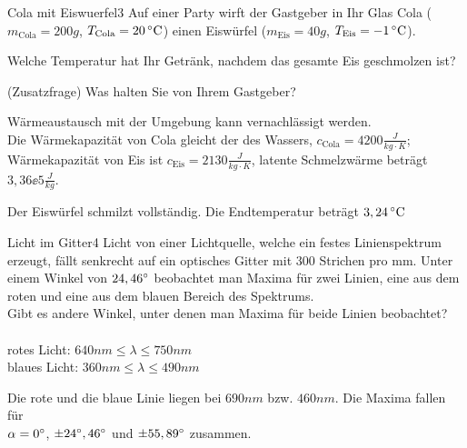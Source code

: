 



\begin{problem}{Cola mit Eiswuerfel}{3}
Auf einer Party wirft der Gastgeber in Ihr Glas Cola ($m_\mathrm{Cola} = 200\unit{g}$, $T_\mathrm{Cola} = 20\,^\circ\mathrm{C}$) einen Eiswürfel ($m_\mathrm{Eis} = 40\unit{g}$, $T_\mathrm{Eis} = -1\,^\circ\mathrm{C}$).
\begin{abcenum}
\item Welche Temperatur hat Ihr Getränk, nachdem das gesamte Eis geschmolzen ist?
\item (Zusatzfrage) Was halten Sie von Ihrem Gastgeber?
\end{abcenum}
Wärmeaustausch mit der Umgebung kann vernachlässigt werden.\\
Die Wärmekapazität von Cola gleicht der des Wassers, $c_{\mathrm{Cola}} = 4200\unit{\frac{J}{kg \cdot K}}$; Wärmekapazität von Eis ist $c_{\mathrm{Eis}} = 2130\unit{\frac{J}{kg \cdot K}}$, latente Schmelzwärme beträgt $3,36\ee{5}\unit{\frac{J}{kg}}$.
\begin{solution}
Der Eiswürfel schmilzt vollständig. Die Endtemperatur beträgt $3,24\,^\circ\mathrm{C}$
\end{solution}
\end{problem}


\begin{problem}{Licht im Gitter}{4}
Licht von einer Lichtquelle, welche ein festes Linienspektrum 
erzeugt, fällt senkrecht auf ein optisches Gitter mit $300$ Strichen 
pro mm. Unter einem Winkel von $24,46^\circ$ beobachtet man Maxima 
für zwei Linien, eine aus dem roten und eine aus dem blauen Bereich des Spektrums.\\
Gibt es andere Winkel, unter denen man Maxima für beide Linien beobachtet?\\
\hinweis\\
rotes Licht: $640\unit{nm}\leq\lambda\leq750\unit{nm}$\\
blaues Licht: $360\unit{nm}\leq\lambda\leq490\unit{nm}$
\begin{solution}
Die rote und die blaue Linie liegen bei $690\unit{nm}$ bzw. $460\unit{nm}$. Die Maxima fallen für\\
$\alpha=0^\circ$, $\pm24^\circ,46^\circ$ und $\pm55,89^\circ$ zusammen.
\end{solution}
\end{problem}


